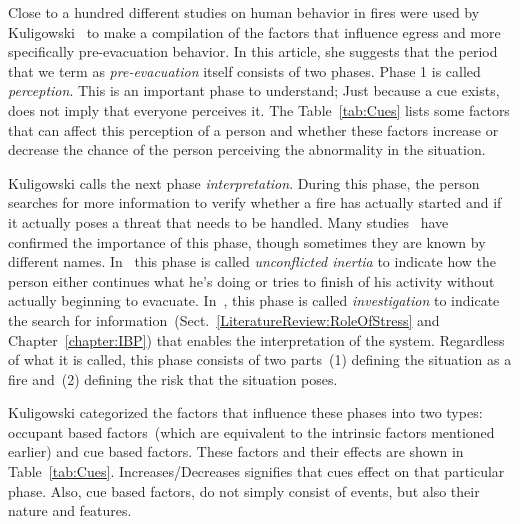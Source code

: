 Close to a hundred different studies on human behavior in fires were used by Kuligowski~\cite{Kuligowski:2009un} to make a compilation of the factors that influence egress and more specifically pre-evacuation behavior. In this article, she suggests that the period that we term as \emph{pre-evacuation} itself consists of two phases. Phase 1 is called \emph{perception}. This is an important phase to understand; Just because a cue exists, does not imply that everyone perceives it. The Table~\ref{tab:Cues} lists some factors that can affect this perception of a person and whether these factors increase or decrease the chance of the person perceiving the abnormality in the situation.

Kuligowski calls the next phase \emph{interpretation}. During this phase, the person searches for more information to verify whether a fire has actually started and if it actually poses a threat that needs to be handled. Many studies~\cite{Ozel:2001tn,Proulx:2007ul} have confirmed the importance of this phase, though sometimes they are known by different names. In~\cite{Ozel:2001tn} this phase is called \emph{unconflicted inertia} to indicate how the person either continues what he's doing or tries to finish of his activity without actually beginning to evacuate. In~\cite{Tong:1985wn}, this phase is called \emph{investigation} to indicate the search for information~(Sect.~\ref{LiteratureReview:RoleOfStress} and Chapter~\ref{chapter:IBP}) that enables the interpretation of the system. Regardless of what it is called, this phase consists of two parts~(1) defining the situation as a fire and~(2) defining the risk that the situation poses.

Kuligowski categorized the factors that influence these phases into two types: occupant based factors~(which are equivalent to the intrinsic factors mentioned earlier) and cue based factors. These factors and their effects are shown in Table~\ref{tab:Cues}. Increases/Decreases signifies that cues effect on that particular phase. Also, cue based factors, do not simply consist of events, but also their nature and features.



